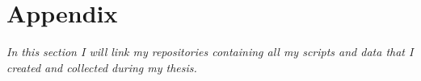 \chapter{Appendix}
\textit{In this section I will link my repositories containing all my scripts and data that I created and collected during my thesis.}